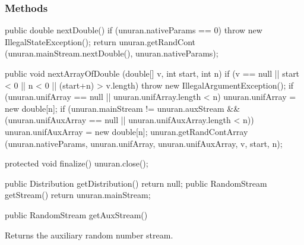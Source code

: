 \subsubsection* {Methods}
\begin{code}\begin{hide}

   public double nextDouble() {
      if (unuran.nativeParams == 0)
         throw new IllegalStateException();
      return unuran.getRandCont (unuran.mainStream.nextDouble(), unuran.nativeParams);
   }

   public void nextArrayOfDouble (double[] v, int start, int n) {
      if (v == null || start < 0 || n < 0 || (start+n) > v.length)
         throw new IllegalArgumentException();
      if (unuran.unifArray == null || unuran.unifArray.length < n)
         unuran.unifArray = new double[n];
      if (unuran.mainStream != unuran.auxStream &&
         (unuran.unifAuxArray == null || unuran.unifAuxArray.length < n))
         unuran.unifAuxArray = new double[n];
      unuran.getRandContArray (unuran.nativeParams, unuran.unifArray,
                        unuran.unifAuxArray, v, start, n);
   }

   protected void finalize() {
      unuran.close();
   }

   public Distribution getDistribution() { return null; }
   public RandomStream getStream() { return unuran.mainStream; }\end{hide}

   public RandomStream getAuxStream()\begin{hide} {
      return unuran.auxStream;
   }
}\end{hide}
\end{code}
\begin{tabb}   Returns the auxiliary random number stream.
\end{tabb}
